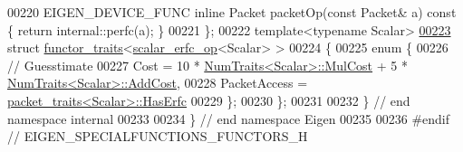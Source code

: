 \begin{DoxyCode}
00220   EIGEN\_DEVICE\_FUNC \textcolor{keyword}{inline} Packet packetOp(\textcolor{keyword}{const} Packet& a)\textcolor{keyword}{ const }\{ \textcolor{keywordflow}{return} internal::perfc(a); \}
00221 \};
00222 \textcolor{keyword}{template}<\textcolor{keyword}{typename} Scalar>
\hyperlink{struct_eigen_1_1internal_1_1functor__traits_3_01scalar__erfc__op_3_01_scalar_01_4_01_4}{00223} \textcolor{keyword}{struct }\hyperlink{struct_eigen_1_1internal_1_1functor__traits}{functor\_traits}<\hyperlink{struct_eigen_1_1internal_1_1scalar__erfc__op}{scalar\_erfc\_op}<Scalar> >
00224 \{
00225   \textcolor{keyword}{enum} \{
00226     \textcolor{comment}{// Guesstimate}
00227     Cost = 10 * \hyperlink{group___core___module_struct_eigen_1_1_num_traits}{NumTraits<Scalar>::MulCost} + 5 * 
      \hyperlink{group___core___module_struct_eigen_1_1_num_traits}{NumTraits<Scalar>::AddCost},
00228     PacketAccess = \hyperlink{struct_eigen_1_1internal_1_1packet__traits}{packet\_traits<Scalar>::HasErfc}
00229   \};
00230 \};
00231 
00232 \} \textcolor{comment}{// end namespace internal}
00233 
00234 \} \textcolor{comment}{// end namespace Eigen}
00235 
00236 \textcolor{preprocessor}{#endif // EIGEN\_SPECIALFUNCTIONS\_FUNCTORS\_H}
\end{DoxyCode}
